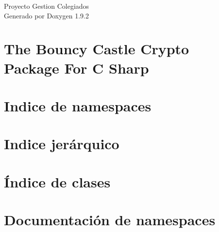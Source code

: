 \documentclass[twoside]{book}
\newcommand{\+}{\discretionary{\mbox{\scriptsize$\hookleftarrow$}}{}{}}
\newcommand{\clearemptydoublepage}{%
    \newpage{\pagestyle{empty}\cleardoublepage}%
  }
\begin{document}
  \raggedbottom
    \hypersetup{pageanchor=false,
                bookmarksnumbered=true,
                pdfencoding=unicode
               }
  \begin{titlepage}
  \vspace*{7cm}
  \begin{center}%
  {\Large Proyecto Gestion Colegiados}\\
  \vspace*{1cm}
  {\large Generado por Doxygen 1.9.2}\\
  \end{center}
  \end{titlepage}
  \clearemptydoublepage
  \tableofcontents
  \clearemptydoublepage
  \hypersetup{pageanchor=true}
\chapter{The Bouncy Castle Crypto Package For C Sharp}
\label{md__c___users__u_s_e_r__documents__git_hub__gestion_de_colegiados__gestion_de_colegiados_package081301559a48dcee9aa1bad2a68720d4}

\chapter{Indice de namespaces}

\chapter{Indice jerárquico}

\chapter{Índice de clases}

\chapter{Documentación de namespaces}


















\end{document}
